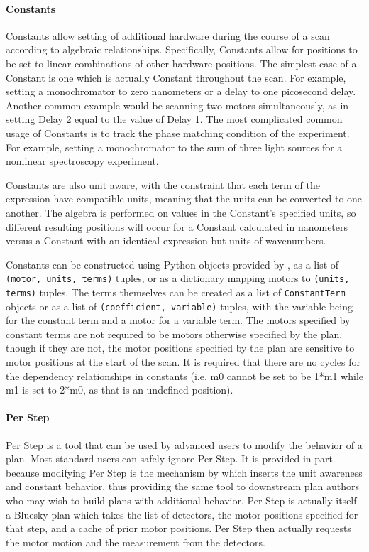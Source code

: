 \paragraph{Constants}

Constants allow setting of additional hardware during the course of a scan according to algebraic relationships.
Specifically, Constants allow for positions to be set to linear combinations of other hardware positions.
The simplest case of a Constant is one which is actually Constant throughout the scan.
For example, setting a monochromator to zero nanometers or a delay to one picosecond delay.
Another common example would be scanning two motors simultaneously, as in setting Delay 2 equal to the value of Delay 1.
The most complicated common usage of Constants is to track the phase matching condition of the experiment.
For example, setting a monochromator to the sum of three light sources for a nonlinear spectroscopy experiment.

Constants are also unit aware, with the constraint that each term of the expression have compatible units, meaning that the units can be converted to one another.
The algebra is performed on values in the Constant's specified units, so different resulting positions will occur for a Constant calculated in nanometers versus a Constant with an identical expression but units of wavenumbers.

Constants can be constructed using Python objects provided by \wrightplans, as a list of \texttt{(motor, units, terms)} tuples, or as a dictionary mapping motors to \texttt{(units, terms)} tuples.
The terms themselves can be created as a list of \texttt{ConstantTerm} objects or as a list of \texttt{(coefficient, variable)} tuples, with the variable being  for the constant term and a motor for a variable term.
The motors specified by constant terms are not required to be motors otherwise specified by the plan, though if they are not, the motor positions specified by the plan are sensitive to motor positions at the start of the scan.
It is required that there are no cycles for the dependency relationships in constants (i.e. m0 cannot be set to be 1*m1 while m1 is set to 2*m0, as that is an undefined position).

\paragraph{Per Step}

Per Step is a tool that can be used by advanced users to modify the behavior of a plan.
Most standard users can safely ignore Per Step.
It is provided in part because modifying Per Step is the mechanism by which \wrightplans inserts the unit awareness and constant behavior, thus providing the same tool to downstream plan authors who may wish to build plans with additional behavior.
Per Step is actually itself a Bluesky plan which takes the list of detectors, the motor positions specified for that step, and a cache of prior motor positions.
Per Step then actually requests the motor motion and the measurement from the detectors.

